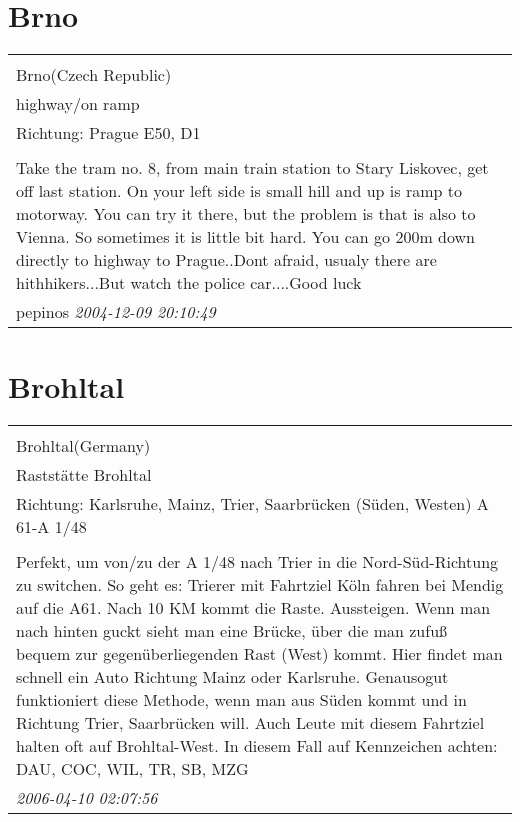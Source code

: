 \documentclass[a4paper,12pt]{article}
\begin{document}
\section{Brno}
\begin{tabular}{|p{13cm}|}
\hline\\
Brno(Czech Republic)\\
highway/on ramp\\
Richtung: Prague E50, D1 \\
\hline\\
Take the tram no. 8, from main train station to Stary Liskovec, get off last station. On your left side is small hill and up is ramp to motorway. You can try it there, but the problem is that is also to Vienna. So sometimes it is little bit hard. You can go 200m down directly to highway to Prague..Dont afraid, usualy there are hithhikers...But watch the police car....Good luck \\
pepinos \textit{ 2004-12-09 20:10:49 }\\\hline
\end{tabular}


\section{Brohltal}
\begin{tabular}{|p{13cm}|}
\hline\\
Brohltal(Germany)\\
Raststätte Brohltal\\
Richtung: Karlsruhe, Mainz, Trier, Saarbrücken (Süden, Westen) A 61-A 1/48 \\
\hline\\
Perfekt, um von/zu der A 1/48 nach Trier in die Nord-Süd-Richtung zu switchen.
So geht es: Trierer mit Fahrtziel Köln fahren bei Mendig auf die A61. Nach 10 KM kommt die Raste. Aussteigen. Wenn man nach hinten guckt sieht man eine Brücke, über die man zufuß bequem zur gegenüberliegenden Rast (West) kommt. Hier findet man schnell ein Auto Richtung Mainz oder Karlsruhe. Genausogut funktioniert diese Methode, wenn man aus Süden kommt und in Richtung Trier, Saarbrücken will. Auch Leute mit diesem Fahrtziel halten oft auf Brohltal-West. In diesem Fall auf Kennzeichen achten: DAU, COC, WIL, TR, SB, MZG \\
\textit{ 2006-04-10 02:07:56 }\\\hline
\end{tabular}
\end{document}
